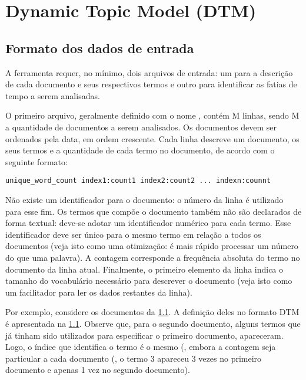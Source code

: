 \section{Dynamic Topic Model (DTM)}


\subsection{Formato dos dados de entrada}

A ferramenta  requer, no mínimo, dois arquivos de entrada:
um para a descrição de cada documento e seus respectivos termos e outro
para identificar as fatias de tempo a serem analisadas.

O primeiro arquivo, geralmente definido com o nome ,
contém M linhas, sendo M a quantidade de documentos a serem analisados.
Os documentos devem ser ordenados pela data, em ordem crescente.
Cada linha descreve um documento, os seus termos e a quantidade de cada
termo no documento, de acordo com o seguinte formato:

\begin{lstlisting}
unique_word_count index1:count1 index2:count2 ... indexn:counnt
\end{lstlisting}

Não existe um identificador para o documento: o número da linha é utilizado
para esse fim. Os termos que compõe o documento também não são declarados
de forma textual: deve-se adotar um identificador numérico para cada termo.
Esse identificador deve ser único para o mesmo termo em relação a todos os
documentos (veja isto como uma otimização: é mais rápido processar um número
do que uma palavra). A contagem corresponde a frequência absoluta do termo
no documento da linha atual. Finalmente, o primeiro elemento da linha indica
o tamanho do vocabulário necessário para descrever o documento (veja isto
como um facilitador para ler os dados restantes da linha).

Por exemplo, considere os documentos da \cref{}. A definição deles no formato
DTM é apresentada na \cref{}. Observe que, para o segundo documento, alguns
termos que já tinham sido utilizados para especificar o primeiro documento,
apareceram. Logo, o índice que identifica o termo é o mesmo (\eg{], 3, 9 e 14},
embora a contagem seja particular a cada documento (\eg{}, o termo 3 apareceu
3 vezes no primeiro documento e apenas 1 vez no segundo documento).

